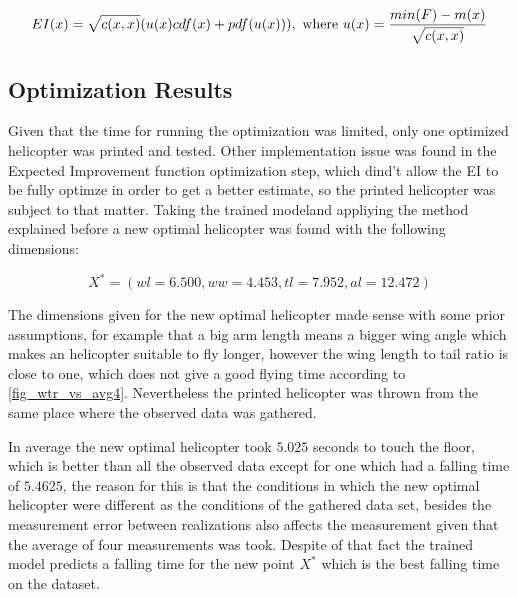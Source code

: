 \begin{equation}
	EI(x) = \sqrt{c(x,x)}(u(x)cdf(x) + pdf(u(x))), \\
	\text{ where } u(x) = \frac{min(F) - m(x)}{\sqrt{c(x,x)}}
\end{equation}

\subsection{Optimization Results}

Given that the time for running the optimization was limited, only one optimized helicopter was printed and tested. Other implementation issue was found in the Expected Improvement function optimization step, which dind't allow the EI to be fully optimze in order to get a better estimate, so the printed helicopter was subject to that matter. Taking the trained modeland appliying the method explained before a new optimal helicopter was found with the following dimensions:

\begin{equation}
	X^* = (wl = 6.500, ww = 4.453, tl = 7.952, al = 12.472)
\end{equation}

The dimensions given for the new optimal helicopter made sense with some prior assumptions, for example that a big arm length means a bigger wing angle which makes an helicopter suitable to fly longer, however the wing length to tail ratio is close to one, which does not give a good flying time according to \ref{fig_wtr_vs_avg4}. Nevertheless the printed helicopter was thrown from the same place where the observed data was gathered.

In average the new optimal helicopter took $5.025$ seconds to touch the floor, which is better than all the observed data except for one which had a falling time of $5.4625$, the reason for this is that the conditions in which the new optimal helicopter were different as the conditions of the gathered data set, besides the measurement error between realizations also affects the measurement given that the average of four measurements was took. Despite of that fact the trained model predicts a falling time for the new point $X^*$ which is the best falling time on the dataset. 
